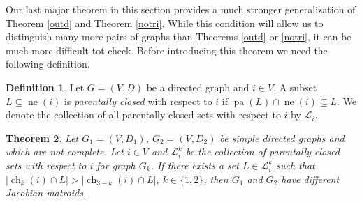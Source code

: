 \documentclass[12pt,reqno]{amsart}
\theoremstyle{plain}
\newtheorem{theorem}{Theorem}[section]
\theoremstyle{definition}
\newtheorem{definition}[theorem]{Definition}
\DeclareMathOperator{\pa}{pa}
\DeclareMathOperator{\ch}{ch}
\DeclareMathOperator{\neighbors}{ne}
\begin{document}
Our last major theorem in this section provides a much stronger generalization of Theorem \ref{outd} and Theorem \ref{notri}. While this condition will allow us to distinguish many more pairs of graphs than Theorems \ref{outd} or \ref{notri}, it can be much more difficult tot check. Before introducing this theorem we need the following definition. 

\begin{definition}
Let $G = (V, D)$ be a directed graph and $i \in V$. A subset $L \subseteq \neighbors(i)$ is \emph{parentally closed} with respect to $i$ if $\pa(L) \cap \neighbors(i) \subseteq L$.
We denote the collection of all parentally closed sets with respect to $i$ by $\mathcal{L}_i$. 
\end{definition}

\begin{theorem}\label{outd_layer}
Let $G_1=(V,D_1)$, $G_2=(V,D_2)$ be simple directed graphs and which are not complete. Let $i \in V$ and $\mathcal{L}_i^k$ be the collection of parentally closed sets with respect to $i$ for graph $G_k$. 
If there exists a set $L\in \mathcal{L}_i^k$ such that $|\ch_{k}(i)\cap L|>|\ch_{3-k}(i)\cap L|$, $k\in\{1,2\}$, then $G_1$ and $G_2$ have different Jacobian matroids.
\end{theorem}
\end{document}
